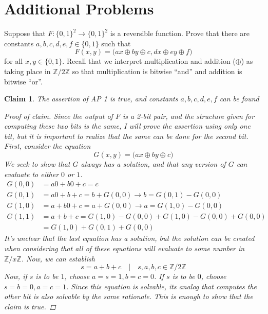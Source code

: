 \documentclass{exam} %
\newcommand{\ZZ}{\mathbb{Z}}
\theoremstyle{plain}
\newtheorem{claim}[thm]{Claim}      \newtheorem*{claim*}{Claim}
\theoremstyle{definition}
\theoremstyle{remark}
\newenvironment{claimproof} {
  \begin{proof}[Proof of claim]
  \renewcommand{\qedsymbol}{\ensuremath{\bullet}}
  } {
  \end{proof}
  }
\numberwithin{equation}{section}  %
\begin{document}
\section{Additional Problems}
\begin{questions}
\question Suppose that $F:\{0,1\}^2 \to \{0,1\}^2$ is a reversible function.
Prove that there are constants $a,b,c,d,e,f\in \{0,1\}$ such that
\[
  F(x,y)
  = \big( ax\oplus by\oplus c, dx\oplus ey\oplus f \big)
\]
for all $x,y\in \{0,1\}$. Recall that we interpret multiplication and
addition ($\oplus$) as taking place in $\ZZ/2\ZZ$ so that multiplication is
bitwise ``and'' and addition is bitwise ``or''.
\begin{solution}
  \begin{claim} The assertion of AP 1 is  
    true, and constants $a, b, c, d, e, f$
    can be found
    \begin{claimproof}
      Since the output of $F$ is a 2-bit pair, and the structure given for computing
      these two bits is the same, I will prove the assertion using only one bit,
      but it is important to realize that the same can be done for the second bit.\\

      First, consider the equation 
      \[
        G(x,y) = \big( ax\oplus by\oplus c\big)
      \]
      We seek to show that $G$ always has a solution, and that any version of $G$
      can evaluate to either $0$ or $1$.
      \begin{align*}
        G(0,0) &= a0 + b0 + c = c\\ 
        G(0,1) &= a0 + b + c = b + G(0,0) \rightarrow b = G(0,1) - G(0,0)\\
        G(1,0) &= a + b0 + c = a + G(0,0) \rightarrow a = G(1,0) - G(0,0)\\
        G(1,1) &= a + b + c = G(1,0) - G(0,0) + G(1,0) - G(0,0) + G(0,0)\\
        &= G(1,0) + G(0,1) + G(0,0) 
      \end{align*}
      It's unclear that the last equation has a solution, but the solution
      can be created when considering that all of these equations will evaluate
      to some number in $\ZZ/x\ZZ$. Now, we can establish
      \[
        s = a + b + c \quad | \quad s,a,b,c \in \ZZ/2\ZZ
      \]
      Now, if $s$ is to be $1$, choose $a = s = 1, b = c = 0$. If $s$ is to 
      be $0$, choose $s = b = 0, a = c = 1$. Since this equation is solvable,
      its analog that computes the other bit is also solvable by the same rationale.
      This is enough to show that the claim is true.
    \end{claimproof}
  \end{claim}
\end{solution}
\end{questions} 
\end{document}
